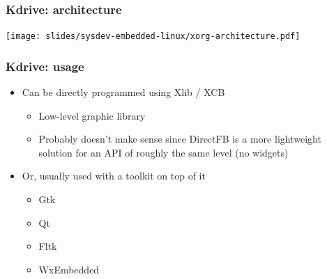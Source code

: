 \begin{frame}
  \frametitle{Kdrive: architecture}
  \begin{center}
    \texttt{[image: slides/sysdev-embedded-linux/xorg-architecture.pdf]}
  \end{center}
\end{frame}

\begin{frame}
  \frametitle{Kdrive: usage}
  \begin{itemize}
  \item Can be directly programmed using Xlib / XCB
    \begin{itemize}
    \item Low-level graphic library
    \item Probably doesn't make sense since DirectFB is a more
      lightweight solution for an API of roughly the same level (no
      widgets)
    \end{itemize}
  \item Or, usually used with a toolkit on top of it
    \begin{itemize}
    \item Gtk
    \item Qt
    \item Fltk
    \item WxEmbedded
    \end{itemize}
  \end{itemize}
\end{frame}

